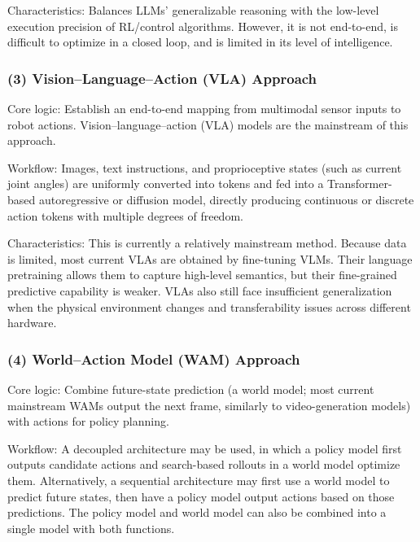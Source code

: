 Characteristics: Balances LLMs' generalizable reasoning with the low-level execution precision of RL/control algorithms. However, it is not end-to-end, is difficult to optimize in a closed loop, and is limited in its level of intelligence.

\hypertarget{visionlanguageaction-vla-approach}{%
\subsubsection{(3) Vision--Language--Action (VLA) Approach}\label{visionlanguageaction-vla-approach}}

Core logic: Establish an end-to-end mapping from multimodal sensor inputs to robot actions. Vision--language--action (VLA) models are the mainstream of this approach.

Workflow: Images, text instructions, and proprioceptive states (such as current joint angles) are uniformly converted into tokens and fed into a Transformer-based autoregressive or diffusion model, directly producing continuous or discrete action tokens with multiple degrees of freedom.

Characteristics: This is currently a relatively mainstream method. Because data is limited, most current VLAs are obtained by fine-tuning VLMs. Their language pretraining allows them to capture high-level semantics, but their fine-grained predictive capability is weaker. VLAs also still face insufficient generalization when the physical environment changes and transferability issues across different hardware.

\hypertarget{worldaction-model-wam-approach}{%
\subsubsection{(4) World--Action Model (WAM) Approach}\label{worldaction-model-wam-approach}}

Core logic: Combine future-state prediction (a world model; most current mainstream WAMs output the next frame, similarly to video-generation models) with actions for policy planning.

Workflow: A decoupled architecture may be used, in which a policy model first outputs candidate actions and search-based rollouts in a world model optimize them. Alternatively, a sequential architecture may first use a world model to predict future states, then have a policy model output actions based on those predictions. The policy model and world model can also be combined into a single model with both functions.

